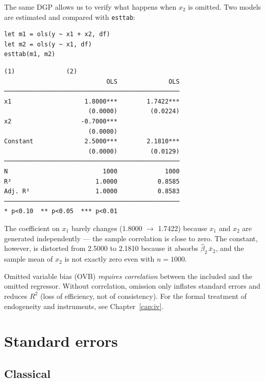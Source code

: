 The same DGP allows us to verify what happens when $x_2$ is omitted.
Two models are estimated and compared with \lstinline{esttab}:

\begin{lstlisting}[caption={Correct model vs.\ omitted $x_2$}]
let m1 = ols(y ~ x1 + x2, df)
let m2 = ols(y ~ x1, df)
esttab(m1, m2)
\end{lstlisting}

\begin{lstlisting}[language={}, basicstyle=\ttfamily\small,
  frame=none, numbers=none, backgroundcolor=\color{codbg},
  xleftmargin=0pt, xrightmargin=0pt, breaklines=false]
                            (1)              (2)
                            OLS              OLS
────────────────────────────────────────────────
x1                    1.8000***        1.7422***
                       (0.0000)         (0.0224)
x2                   -0.7000***
                       (0.0000)
Constant              2.5000***        2.1810***
                       (0.0000)         (0.0129)
────────────────────────────────────────────────
N                          1000             1000
R²                       1.0000           0.8585
Adj. R²                  1.0000           0.8583
────────────────────────────────────────────────
* p<0.10  ** p<0.05  *** p<0.01
\end{lstlisting}

\noindent The coefficient on $x_1$ barely changes (1.8000 $\to$ 1.7422) because
$x_1$ and $x_2$ are generated independently --- the sample correlation is
close to zero. The constant, however, is distorted from 2.5000 to 2.1810 because
it absorbs $\hat\beta_2\,\bar{x}_2$, and the sample mean of $x_2$ is not
exactly zero even with $n=1000$.

\begin{nota}
  Omitted variable bias (OVB) \emph{requires correlation} between the included
  and the omitted regressor. Without correlation, omission only inflates standard
  errors and reduces $R^2$ (loss of efficiency, not of consistency). For the
  formal treatment of endogeneity and instruments, see
  Chapter~\ref{cap:iv}.
\end{nota}

\section{Standard errors}

\subsection*{Classical}


